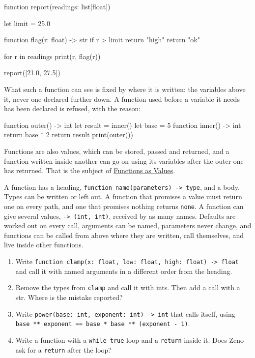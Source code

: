 \begin{zeno}
function report(readings: list[float]) {
    let limit = 25.0

    function flag(r: float) -> str {
        if r > limit {
            return "high"
        }
        return "ok"
    }

    for r in readings {
        print(r, flag(r))
    }
}

report([21.0, 27.5])
\end{zeno}

What such a function can see is fixed by where it is written: the
variables above it, never one declared further down. A function used
before a variable it needs has been declared is refused, with the
reason:

\begin{zeno}[fails=yes]
function outer() -> int {
    let result = inner()
    let base = 5
    function inner() -> int {
        return base * 2
    }
    return result
}
print(outer())
\end{zeno}

Functions are also values, which can be stored, passed and returned,
and a function written inside another can go on using its variables
after the outer one has returned. That is the subject of
\hyperref[ch-function-values]{Functions as Values}.

\begin{summary}
A function has a heading, \verb|function name(parameters) -> type|,
and a body. Types can be written or left out. A function that
promises a value must return one on every path, and one that promises
nothing returns \verb|none|. A function can give several values,
\verb|-> (int, int)|, received by as many names. Defaults are worked
out on every call,
arguments can be named, parameters never change, and functions can be
called from above where they are written, call themselves, and live
inside other functions.
\end{summary}

\begin{tryit}
\begin{enumerate}
\item Write \verb|function clamp(x: float, low: float, high: float) -> float|
  and call it with named arguments in a different order from the
  heading.
\item Remove the types from \verb|clamp| and call it with ints. Then
  add a call with a str. Where is the mistake reported?
\item Write \verb|power(base: int, exponent: int) -> int| that calls
  itself, using \verb|base ** exponent == base * base ** (exponent - 1)|.
\item Write a function with a \verb|while true| loop and a
  \verb|return| inside it. Does Zeno ask for a \verb|return| after the
  loop?
\end{enumerate}
\end{tryit}
